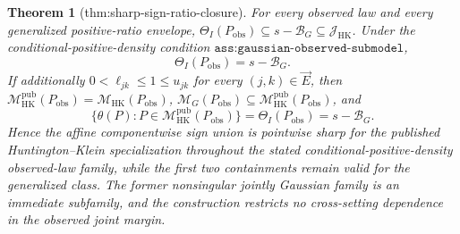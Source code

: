 \documentclass{article}
\newtheorem{theorem}{Theorem}
\begin{document}
\begin{theorem}[thm:sharp-sign-ratio-closure]\label{thm:sharp-sign-ratio-closure}
For every observed law and every generalized positive-ratio envelope, \(\Theta_I(P_{\mathrm{obs}})\subseteq s-\mathcal B_G\subseteq\mathcal J_{\mathrm{HK}}\).  Under the conditional-positive-density condition \(\texttt{ass:gaussian-observed-submodel}\),
\[
\Theta_I(P_{\mathrm{obs}})=s-\mathcal B_G.
\]
If additionally \(0<\ell_{jk}\le1\le u_{jk}\) for every \((j,k)\in\vec E\), then \(\mathcal M_{\mathrm{HK}}^{\mathrm{pub}}(P_{\mathrm{obs}})=\mathcal M_{\mathrm{HK}}(P_{\mathrm{obs}})\), \(\mathcal M_G(P_{\mathrm{obs}})\subseteq\mathcal M_{\mathrm{HK}}^{\mathrm{pub}}(P_{\mathrm{obs}})\), and
\[
\{\theta(P):P\in\mathcal M_{\mathrm{HK}}^{\mathrm{pub}}(P_{\mathrm{obs}})\}
=\Theta_I(P_{\mathrm{obs}})=s-\mathcal B_G.
\]
Hence the affine componentwise sign union is pointwise sharp for the published Huntington--Klein specialization throughout the stated conditional-positive-density observed-law family, while the first two containments remain valid for the generalized class.  The former nonsingular jointly Gaussian family is an immediate subfamily, and the construction restricts no cross-setting dependence in the observed joint margin.
\end{theorem}
\end{document}
